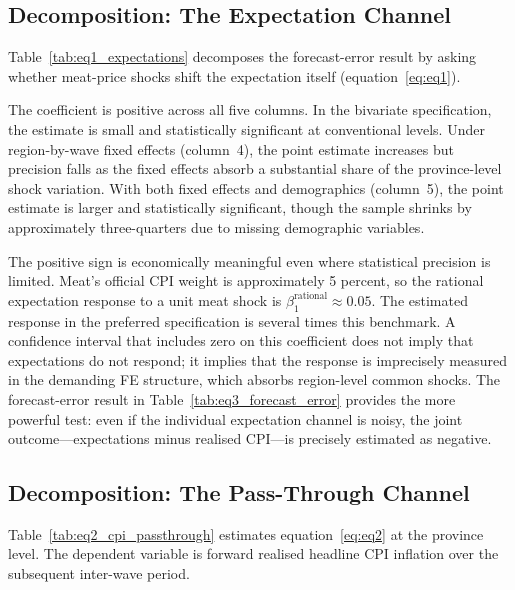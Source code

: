 \subsection{Decomposition: The Expectation Channel}%
\label{sec:eq1}



Table~\ref{tab:eq1_expectations} decomposes the forecast-error
result by asking whether meat-price shocks shift the expectation
itself (equation~\eqref{eq:eq1}).

The coefficient is positive across all five columns.
In the bivariate specification, the estimate is small and
statistically significant at conventional levels.
Under region-by-wave fixed effects (column~4), the point estimate
increases but precision falls as the fixed effects absorb a
substantial share of the province-level shock variation.
With both fixed effects and demographics (column~5), the point
estimate is larger and statistically significant, though the sample
shrinks by approximately three-quarters due to missing demographic
variables.

The positive sign is economically meaningful even where statistical
precision is limited.
Meat's official CPI weight is approximately 5 percent, so the
rational expectation response to a unit meat shock is
$\beta_1^{\text{rational}} \approx 0.05$.
The estimated response in the preferred specification is several
times this benchmark.
A confidence interval that includes zero on this coefficient
does not imply that expectations do not respond; it implies that
the response is imprecisely measured in the demanding FE structure,
which absorbs region-level common shocks.
The forecast-error result in Table~\ref{tab:eq3_forecast_error}
provides the more powerful test: even if the individual expectation
channel is noisy, the joint outcome---expectations minus
realised CPI---is precisely estimated as negative.

\subsection{Decomposition: The Pass-Through Channel}%
\label{sec:eq2}



Table~\ref{tab:eq2_cpi_passthrough} estimates equation~\eqref{eq:eq2}
at the province level.
The dependent variable is forward realised headline CPI inflation
over the subsequent inter-wave period.

